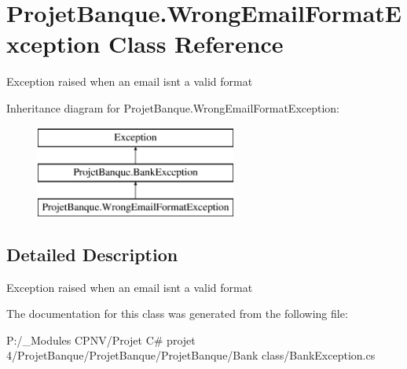 \hypertarget{class_projet_banque_1_1_wrong_email_format_exception}{}\section{Projet\+Banque.\+Wrong\+Email\+Format\+Exception Class Reference}
\label{class_projet_banque_1_1_wrong_email_format_exception}


Exception raised when an email isn\textquotesingle{}t a valid format  


Inheritance diagram for Projet\+Banque.\+Wrong\+Email\+Format\+Exception\+:\begin{figure}[H]
\begin{center}
\leavevmode
\includegraphics[height=3.000000cm]{class_projet_banque_1_1_wrong_email_format_exception}
\end{center}
\end{figure}


\subsection{Detailed Description}
Exception raised when an email isn\textquotesingle{}t a valid format 



The documentation for this class was generated from the following file\+:\begin{DoxyCompactItemize}
\item 
P\+:/\+\_\+\+Modules C\+P\+N\+V/\+Projet C\# projet 4/\+Projet\+Banque/\+Projet\+Banque/\+Projet\+Banque/\+Bank class/Bank\+Exception.\+cs\end{DoxyCompactItemize}
